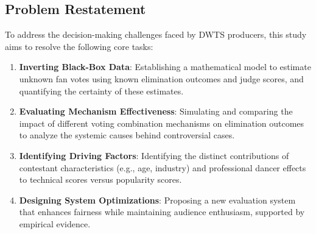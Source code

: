 \documentclass[12pt]{article}
\begin{document}
	\subsection{Problem Restatement}
	To address the decision-making challenges faced by DWTS producers, this study aims to resolve the following core tasks:
	\begin{enumerate}
		\item \textbf{Inverting Black-Box Data}: Establishing a mathematical model to estimate unknown fan votes using known elimination outcomes and judge scores, and quantifying the certainty of these estimates.
		\item \textbf{Evaluating Mechanism Effectiveness}: Simulating and comparing the impact of different voting combination mechanisms on elimination outcomes to analyze the systemic causes behind controversial cases.
		\item \textbf{Identifying Driving Factors}: Identifying the distinct contributions of contestant characteristics (e.g., age, industry) and professional dancer effects to technical scores versus popularity scores.
		\item \textbf{Designing System Optimizations}: Proposing a new evaluation system that enhances fairness while maintaining audience enthusiasm, supported by empirical evidence.
	\end{enumerate}
	
\end{document}
